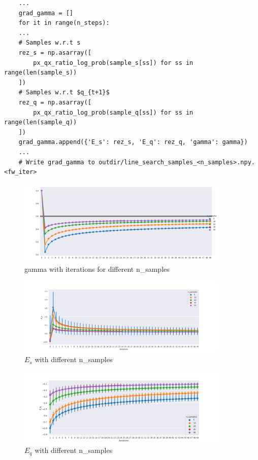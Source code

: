 \begin{verbatim}
    ...
    grad_gamma = []
    for it in range(n_steps):
    ...
    # Samples w.r.t s
    rez_s = np.asarray([
        px_qx_ratio_log_prob(sample_s[ss]) for ss in range(len(sample_s))
    ])
    # Samples w.r.t $q_{t+1}$
    rez_q = np.asarray([
        px_qx_ratio_log_prob(sample_q[ss]) for ss in range(len(sample_q))
    ])
    grad_gamma.append({'E_s': rez_s, 'E_q': rez_q, 'gamma': gamma})
    ...
    # Write grad_gamma to outdir/line_search_samples_<n_samples>.npy.<fw_iter>
\end{verbatim}
\begin{figure}[h] \label{fig:gamma}
  \centering
  \includegraphics[width=0.9\textwidth]{plots/test_gamma.png}
  \caption{gamma with iterations for different n\_samples}
\end{figure}
\begin{figure}[h] \label{fig:es}
  \centering
  \includegraphics[width=0.9\textwidth]{plots/test_e_s.png}
  \caption{$E_s$ with different n\_samples}
\end{figure}
\begin{figure}[h] \label{fig:eq}
  \centering
  \includegraphics[width=0.9\textwidth]{plots/test_e_q.png}
  \caption{$E_q$ with different n\_samples}
  \small{}
\end{figure}


